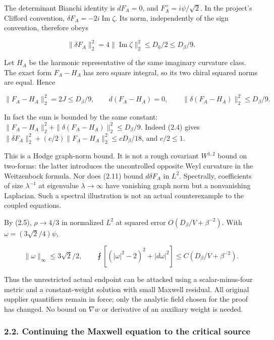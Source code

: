 \documentclass[
  11pt,
]{article}
\begin{document}
The determinant Bianchi identity is \(dF_A=0\), and
\(F_A^+=i\psi/\sqrt2\). In the project's Clifford convention,
\(\delta F_A=-2i\operatorname{Im}\zeta\). Its norm, independently of the
sign convention, therefore obeys

\[
 \boxed{\|\delta F_A\|_2^2
 =4\|\operatorname{Im}\zeta\|_2^2
 \le D_0/2\le D_\beta/9.}
 \tag{2.10}
\]

Let \(H_A\) be the harmonic representative of the same imaginary
curvature class. The exact form \(F_A-H_A\) has zero square integral, so
its two chiral squared norms are equal. Hence

\[
 \boxed{\|F_A-H_A\|_2^2=2J\le D_\beta/9,\qquad
 d(F_A-H_A)=0,\qquad
 \|\delta(F_A-H_A)\|_2^2\le D_\beta/9.}
 \tag{2.11}
\]

In fact the sum is bounded by the same constant:
\(\|F_A-H_A\|_2^2+\|\delta(F_A-H_A)\|_2^2\le D_\beta/9\). Indeed (2.4)
gives \(\|\delta F_A\|_2^2+(c/2)\|F_A-H_A\|_2^2\le cD_\beta/18\), and
\(c/2\le1\).

This is a Hodge graph-norm bound. It is not a rough covariant
\(W^{1,2}\) bound on two-forms: the latter introduces the uncontrolled
opposite Weyl curvature in the Weitzenbock formula. Nor does (2.11)
bound \(d\delta F_A\) in \(L^2\). Spectrally, coefficients of size
\(\lambda^{-1}\) at eigenvalue \(\lambda\to\infty\) have vanishing graph
norm but a nonvanishing Laplacian. Such a spectral illustration is not
an actual counterexample to the coupled equations.

By (2.5), \(\rho\to4/3\) in normalized \(L^2\) at squared error
\(O(D_\beta/V+\beta^{-2})\). With \(\omega=(3\sqrt2/4)\psi\),

\[
 \|\omega\|_\infty\le3\sqrt2/2,\qquad
 \fint\left[(|\omega|^2-2)^2+|d\omega|^2\right]
       \le C(D_\beta/V+\beta^{-2}).
 \tag{2.12}
\]

Thus the unrestricted actual endpoint can be attacked using a
scalar-minus-four metric and a constant-weight solution with small
Maxwell residual. All original supplier quantifiers remain in force;
only the analytic field chosen for the proof has changed. No bound on
\(\nabla w\) or derivative of an auxiliary weight is needed.

\hypertarget{continuing-the-maxwell-equation-to-the-critical-source}{%
\subsubsection{2.2. Continuing the Maxwell equation to the critical
source}\label{continuing-the-maxwell-equation-to-the-critical-source}}
\end{document}

